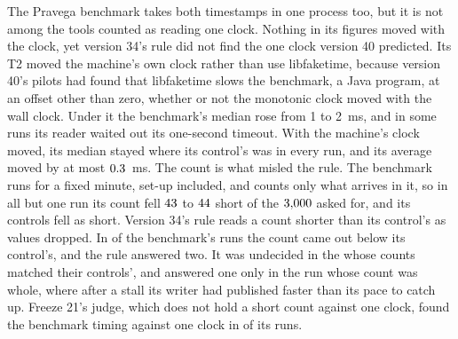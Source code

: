\documentclass[10pt,journal,onecolumn]{IEEEtran}
\begin{document}
The Pravega benchmark takes both timestamps in one process too, but it is not among the
\toolsOneClockWord{} tools counted as reading one clock. Nothing in its figures moved with the
clock, yet version 34's rule did not
find the one clock version 40 predicted. Its T2 moved the machine's own clock rather than use
libfaketime, because version 40's pilots had found that libfaketime slows the benchmark, a Java
program, at an offset other than zero, whether or not the monotonic clock moved with the wall
clock. Under it the benchmark's median rose from 1 to 2~ms, and in some runs its reader waited out
its one-second timeout. With the machine's clock moved, its median stayed where its control's was
in every run, and its average moved by at most $0.3$~ms. The count is what
misled the rule. The benchmark runs for a fixed minute, set-up included, and counts only what
arrives in it, so in all but one run its count fell $43$ to
$44$ short of the $3{,}000$ asked for, and its controls fell as short.
Version 34's rule reads a count shorter than its control's as values dropped. In
\toolsCountedTwoWord{} of the benchmark's \toolsCountedRunsWord{} runs the count came out
\toolsPravegaBelowControlWord{} below its control's, and the rule answered two. It was undecided in
the \toolsCountedUndecidedWord{} whose counts matched their controls', and answered one only in the
\toolsCountedOneWord{} run whose count was whole, where after a stall its writer had published
faster than its pace to catch up. Freeze 21's judge, which does not hold a short count against one
clock, found the benchmark timing against one clock in \toolsCountedJudgedOneWord{} of its
\toolsCountedRunsWord{} runs.
\end{document}
